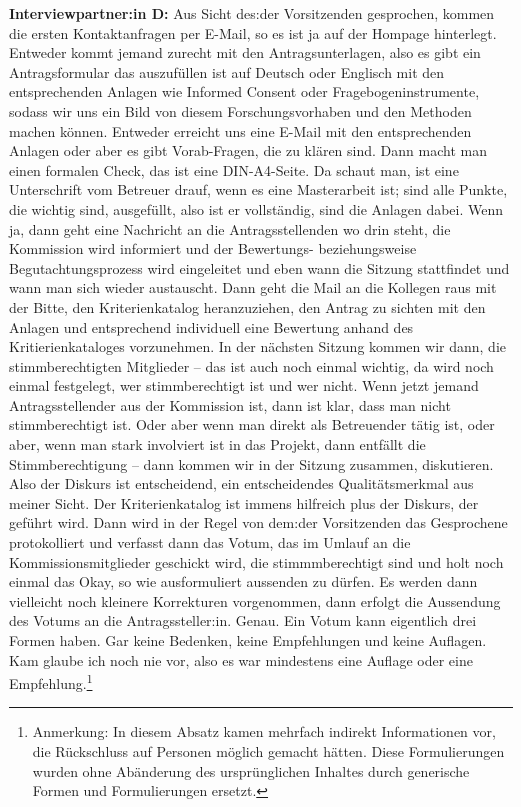 \documentclass[a4paper,12pt,twoside]{scrreprt}
\begin{document}
\textbf{Interviewpartner:in D:} Aus Sicht des:der Vorsitzenden gesprochen, kommen die ersten Kontaktanfragen per E-Mail, so es ist ja auf der Hompage  hinterlegt. Entweder kommt jemand zurecht mit den Antragsunterlagen, also es gibt ein Antragsformular das auszufüllen ist auf Deutsch oder Englisch mit den entsprechenden Anlagen wie Informed Consent oder Fragebogeninstrumente, sodass wir uns ein Bild von diesem Forschungsvorhaben und den Methoden machen können. Entweder erreicht uns eine E-Mail mit den entsprechenden Anlagen oder aber es gibt Vorab-Fragen, die zu klären sind. Dann macht man einen formalen Check, das ist eine DIN-A4-Seite. Da schaut man, ist eine Unterschrift vom Betreuer drauf, wenn es eine Masterarbeit ist; sind alle Punkte, die wichtig sind, ausgefüllt, also ist er vollständig, sind die Anlagen dabei. Wenn ja, dann geht eine Nachricht an die Antragsstellenden wo drin steht, die Kommission wird informiert und der Bewertungs- beziehungsweise Begutachtungsprozess wird eingeleitet und eben wann die Sitzung stattfindet und wann man sich wieder austauscht. Dann geht die Mail an die Kollegen raus mit der Bitte, den Kriterienkatalog heranzuziehen, den Antrag zu sichten mit den Anlagen und entsprechend individuell eine Bewertung anhand des Kritierienkataloges vorzunehmen. In der nächsten Sitzung kommen wir dann, die stimmberechtigten Mitglieder -- das ist auch noch einmal wichtig, da wird noch einmal festgelegt, wer stimmberechtigt ist und wer nicht. Wenn jetzt jemand Antragsstellender aus der Kommission ist, dann ist klar, dass man nicht stimmberechtigt ist. Oder aber wenn man direkt als Betreuender tätig ist, oder aber, wenn man stark involviert ist in das Projekt, dann entfällt die Stimmberechtigung -- dann kommen wir in der Sitzung zusammen, diskutieren. Also der Diskurs ist entscheidend, ein entscheidendes Qualitätsmerkmal aus meiner Sicht. Der Kriterienkatalog ist immens hilfreich plus der Diskurs, der geführt wird. Dann wird in der Regel von dem:der Vorsitzenden das Gesprochene protokolliert und verfasst dann das Votum, das im Umlauf an die Kommissionsmitglieder geschickt wird, die stimmmberechtigt sind und holt noch einmal das Okay, so wie ausformuliert aussenden zu dürfen. Es werden dann vielleicht noch kleinere Korrekturen vorgenommen, dann erfolgt die Aussendung des Votums an die Antragssteller:in. Genau. Ein Votum kann eigentlich drei Formen haben. Gar keine Bedenken, keine Empfehlungen und keine Auflagen. Kam glaube ich noch nie vor, also es war mindestens eine Auflage oder eine Empfehlung.\footnote{Anmerkung: In diesem Absatz kamen mehrfach indirekt Informationen vor, die Rückschluss auf Personen möglich gemacht hätten. Diese Formulierungen wurden ohne Abänderung des ursprünglichen Inhaltes durch generische Formen und Formulierungen ersetzt.}
\end{document}
